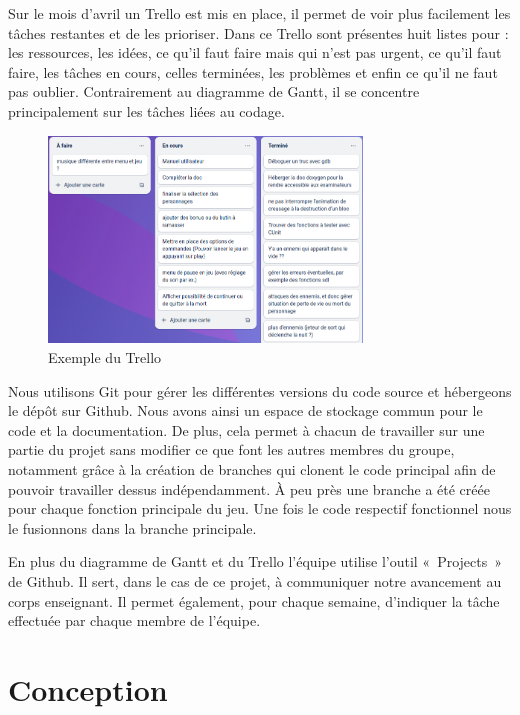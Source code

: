 \documentclass[a4paper,12pt]{article}
\begin{document}
Sur le mois d’avril un Trello est mis en place, il permet de voir plus facilement les tâches restantes et de les prioriser. 
Dans ce Trello sont présentes huit listes pour : les ressources, les idées, ce qu’il faut faire mais qui n’est pas urgent, ce qu’il faut faire, les tâches en cours, celles terminées, les problèmes et enfin ce qu’il ne faut pas oublier. 
Contrairement au diagramme de Gantt, il se concentre principalement sur les tâches liées au codage.

\begin{figure}[h]
	\centering
	\includegraphics[height=5.5cm]{img/capture_trello.png}
	\caption{Exemple du Trello}
	\label{trello}
\end{figure}

Nous utilisons Git pour gérer les différentes versions du code source et hébergeons le dépôt sur Github.
Nous avons ainsi un espace de stockage commun pour le code et la documentation. De plus, cela permet à chacun de travailler sur une partie du projet sans modifier ce que font les autres membres du groupe, notamment grâce à la création de branches qui clonent le code principal afin de pouvoir travailler dessus indépendamment.
À peu près une branche a été créée pour chaque fonction principale du jeu. Une fois le code respectif fonctionnel nous le fusionnons dans la branche principale.

En plus du diagramme de Gantt et du Trello l’équipe utilise l’outil « Projects » de Github.
Il sert, dans le cas de ce projet, à communiquer notre avancement au corps enseignant. 
Il permet également, pour chaque semaine, d’indiquer la tâche effectuée par chaque membre de l’équipe.



\section{Conception}
\end{document}
